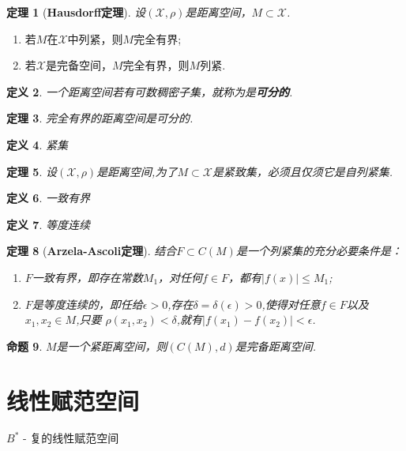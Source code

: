 \documentclass{ctexrep}
\newtheorem{defn}{定义}[section]
\newtheorem{prop}[defn]{命题}
\newtheorem{thm}[defn]{定理}
\newcommand{\X}{\mathscr{X}}
\newcommand{\Xp}{(\mathscr{X},\rho)}
\begin{document}
\begin{thm}[\textbf{Hausdorff定理}]
设$\Xp$是距离空间，$M \subset \X$.
\end{thm}

\renewcommand{\labelenumi}{(\theenumi)}
\begin{enumerate}
\item 若$M$在$\X$中列紧，则$M$完全有界;
\item 若$\X$是完备空间，$M$完全有界，则$M$列紧.
\end{enumerate}

\begin{defn}
一个距离空间若有可数稠密子集，就称为是\textbf{可分的}.
\end{defn}

\begin{thm}
完全有界的距离空间是可分的.
\end{thm}

\begin{defn}
紧集
\end{defn}

\begin{thm}
设$\Xp$是距离空间,为了$M \subset \X$是紧致集，必须且仅须它是自列紧集.
\end{thm}

\begin{defn}
一致有界
\end{defn}

\begin{defn}
等度连续
\end{defn}

\begin{thm}[\textbf{Arzela-Ascoli定理}]
结合$F \subset C(M)$是一个列紧集的充分必要条件是：
\renewcommand{\labelenumi}{(\theenumi)}
\begin{enumerate}
\item $F$一致有界，即存在常数$M_1$，对任何$f \in F$，都有$|f(x)|
  \leq M_1$;
\item $F$是等度连续的，即任给$\epsilon > 0$,存在$\delta =
  \delta(\epsilon) > 0$,使得对任意$f \in F$以及$x_1,x_2 \in M$,只要
  $\rho(x_1,x_2) < \delta$,就有$|f(x_1) - f(x_2)| < \epsilon$.
\end{enumerate}
\end{thm}

\begin{prop}
$M$是一个紧距离空间，则$(C(M), d)$是完备距离空间.
\end{prop}

\section{线性赋范空间}
$B^*$ - 复的线性赋范空间
\end{document}
